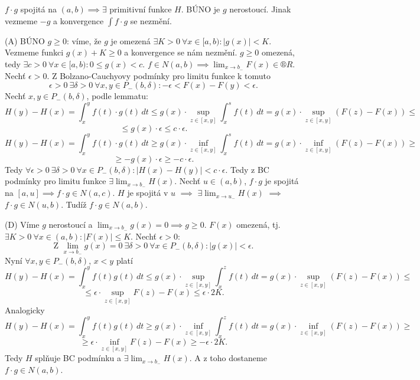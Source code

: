 \documentclass[12pt]{article}                   %
\begin{document}
        \begin{dukaz}
            $f·g$ spojitá na $(a, b) \implies \exists$ primitivní funkce $H$. BÚNO je $g$ nerostoucí. Jinak vezmeme $-g$ a konvergence $\int f·g$ se nezmění.

            (A) BÚNO $g≥0$: víme, že $g$ je omezená $\exists K > 0\ \forall x \in [a, b):|g(x)|<K$. Vezmeme funkci $g(x) + K ≥ 0$ a konvergence se nám nezmění. $g ≥ 0$ omezená, tedy $\exists c > 0\ \forall x \in [a, b): 0 ≤ g(x) < c$. $f \in N(a, b) \implies \lim_{x \rightarrow b_-} F(x) \in ®R$. Nechť $\epsilon > 0$. Z Bolzano-Cauchyovy podmínky pro limitu funkce k tomuto
            $$ \epsilon > 0\ \exists \delta > 0\ \forall x, y \in P_-(b, \delta): -\epsilon < F(x) - F(y) < \epsilon. $$
            Nechť $x, y \in P_-(b, \delta)$, podle lemmatu:
            $$ H(y) - H(x) = \int_x^y f(t)·g(t)\,dt ≤ g(x)·\sup_{z \in [x, y]} \int_x^s f(t)\,dt = g(x)·\sup_{z \in [x, y]} (F(z) - F(x)) ≤ $$
            $$ ≤ g(x)·\epsilon ≤ c·\epsilon. $$
            $$ H(y) - H(x) = \int_x^y f(t)·g(t)\,dt ≥ g(x)·\inf_{z \in [x, y]} \int_x^s f(t)\,dt = g(x)·\inf_{z \in [x, y]} (F(z) - F(x)) ≥ $$
            $$ ≥ -g(x)·\epsilon ≥ -c·\epsilon. $$
            Tedy $\forall \epsilon > 0\ \exists \delta > 0\ \forall x \in P_-(b, \delta): |H(x) - H(y)| < c·\epsilon$. Tedy z BC podmínky pro limitu funkce $\exists \lim_{x \rightarrow b_-} H(x)$. Nechť $u \in (a, b)$, $f·g$ je spojitá na $[a, u] \implies f·g \in N(a, c)$. $H$ je spojitá v $u$ $\implies$ $\exists \lim_{x \rightarrow u_-} H(x)$ $\implies$ $f·g \in N(u, b)$. Tudíž $f·g \in N(a, b)$.

            (D) Víme $g$ nerostoucí a $\lim_{x \rightarrow b_-} g(x) = 0 \implies g ≥ 0$. $F(x)$ omezená, tj. $\exists K > 0\ \forall x \in (a, b): |F(x)| ≤ K$. Nechť $\epsilon > 0$:
            $$ \text{Z } \lim_{x \rightarrow b_-} g(x) = 0\ \exists \delta > 0\ \forall x \in P_-(b, \delta): |g(x)|<\epsilon. $$ 
            Nyní $\forall x, y \in P_-(b, \delta)$, $x < y$ platí
            $$ H(y) - H(x) = \int_x^y f(t)g(t)\,dt ≤ g(x)·\sup_{z \in [x, y]} \int_x^zf(t)\,dt = g(x)·\sup_{z \in [x, y]} (F(z) - F(x)) ≤ $$
            $$ ≤ \epsilon·\sup_{z \in [x, y]}F(z) - F(x) ≤ \epsilon · 2K. $$ 
            Analogicky
            $$ H(y) - H(x) = \int_x^y f(t)g(t)\,dt ≥ g(x)·\inf_{z \in [x, y]} \int_x^zf(t)\,dt = g(x)·\inf_{z \in [x, y]} (F(z) - F(x)) ≥ $$
            $$ ≥ \epsilon·\inf_{z \in [x, y]}F(z) - F(x) ≥ - \epsilon · 2K. $$
            Tedy $H$ splňuje BC podmínku a $\exists \lim_{x \rightarrow b_-} H(x)$. A z toho dostaneme $f·g \in N(a, b)$.
        \end{dukaz}
\end{document}
